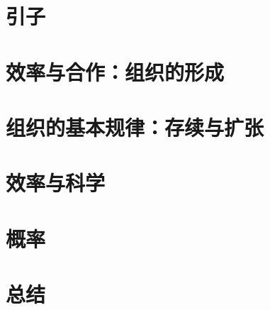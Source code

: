 \section{引子}
\section{效率与合作：组织的形成}
\section{组织的基本规律：存续与扩张}
\section{效率与科学}
\section{概率}
\section{总结}
